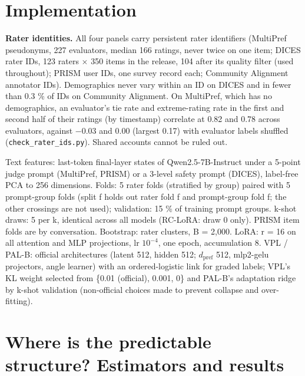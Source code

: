 \documentclass{article}
\begin{document}
\section{Implementation}

\textbf{Rater identities.} All four panels carry persistent rater identifiers (MultiPref pseudonyms, 227 evaluators, median 166 ratings, never twice on one item; DICES rater IDs, 123 raters $\times$ 350 items in the release, 104 after its quality filter (used throughout); PRISM user IDs, one survey record each; Community Alignment annotator IDs). Demographics never vary within an ID on DICES and in fewer than 0.3 \% of IDs on Community Alignment. On MultiPref, which has no demographics, an evaluator's tie rate and extreme-rating rate in the first and second half of their ratings (by timestamp) correlate at 0.82 and 0.78 across evaluators, against $-$0.03 and 0.00 (largest 0.17) with evaluator labels shuffled (\texttt{check\_rater\_ids.py}). Shared accounts cannot be ruled out.

Text features: last-token final-layer states of Qwen2.5-7B-Instruct under a 5-point judge prompt (MultiPref, PRISM) or a 3-level safety prompt (DICES), label-free PCA to 256 dimensions. Folds: 5 rater folds (stratified by group) paired with 5 prompt-group folds (split f holds out rater fold f and prompt-group fold f; the other crossings are not used); validation: 15 \% of training prompt groups. k-shot draws: 5 per k, identical across all models (RC-LoRA: draw 0 only). PRISM item folds are by conversation. Bootstrap: rater clusters, B = 2,000. LoRA: r = 16 on all attention and MLP projections, lr \(10^{-4}\), one epoch, accumulation 8. VPL / PAL-B: official architectures (latent 512, hidden 512; \(d_{\text{pref}}\) 512, mlp2-gelu projectors, angle learner) with an ordered-logistic link for graded labels; VPL's KL weight selected from \{0.01 (official), 0.001, 0\} and PAL-B's adaptation ridge by k-shot validation (non-official choices made to prevent collapse and over-fitting).

\section{Where is the predictable structure? Estimators and results}
\end{document}
